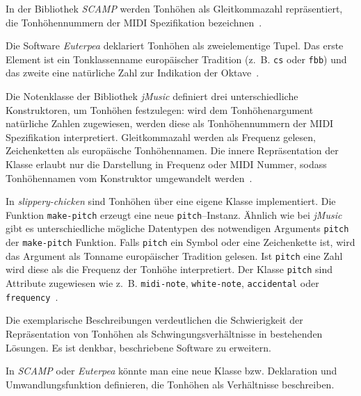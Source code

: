 \documentclass[12pt,a4paper,ngerman]{article}
\begin{document}
\bigskip

\noindent
In der Bibliothek \emph{SCAMP} werden Tonhöhen als Gleitkommazahl repräsentiert, die Tonhöhennummern der MIDI Spezifikation bezeichnen~\parencite{scampNoteLikeDefinition}.

\smallskip

Die Software \emph{Euterpea} deklariert Tonhöhen als zweielementige Tupel.
Das erste Element ist ein Tonklassenname europäischer Tradition (z.~B. \texttt{cs} oder \texttt{fbb}) und das zweite eine natürliche Zahl zur Indikation der Oktave~\parencite{euterpeaPitchDefinition}.

\smallskip

Die Notenklasse der Bibliothek \emph{jMusic} definiert drei unterschiedliche Konstruktoren, um Tonhöhen festzulegen:
wird dem Tonhöhenargument natürliche Zahlen zugewiesen, werden diese als Tonhöhennummern der MIDI Spezifikation interpretiert.
Gleitkommazahl werden als Frequenz gelesen, Zeichenketten als europäische Tonhöhennamen.
Die innere Repräsentation der Klasse erlaubt nur die Darstellung in Frequenz oder MIDI Nummer, sodass Tonhöhennamen vom Konstruktor umgewandelt werden~\parencite{jMusicSource}.

\smallskip

In \emph{slippery-chicken} sind Tonhöhen über eine eigene Klasse implementiert.
Die Funktion \texttt{make-pitch} erzeugt eine neue \texttt{pitch}--Instanz.
Ähnlich wie bei \emph{jMusic} gibt es unterschiedliche mögliche Datentypen des notwendigen Arguments \texttt{pitch} der \texttt{make-pitch} Funktion.
Falls \texttt{pitch} ein Symbol oder eine Zeichenkette ist, wird das Argument als Tonname europäischer Tradition gelesen.
Ist \texttt{pitch} eine Zahl wird diese als die Frequenz der Tonhöhe interpretiert.
Der Klasse \texttt{pitch} sind Attribute zugewiesen wie z.~B. \texttt{midi-note}, \texttt{white-note}, \texttt{accidental} oder \texttt{frequency}~\parencite{slipperyChickenSource}.

\bigskip

\noindent
Die exemplarische Beschreibungen verdeutlichen die Schwierigkeit der Repräsentation von Tonhöhen als Schwingungsverhältnisse in bestehenden Lösungen.
Es ist denkbar, beschriebene Software zu erweitern.

\smallskip

In \emph{SCAMP} oder \emph{Euterpea} könnte man eine neue Klasse bzw. Deklaration und Umwandlungsfunktion definieren, die Tonhöhen als Verhältnisse beschreiben.

\smallskip
\end{document}
